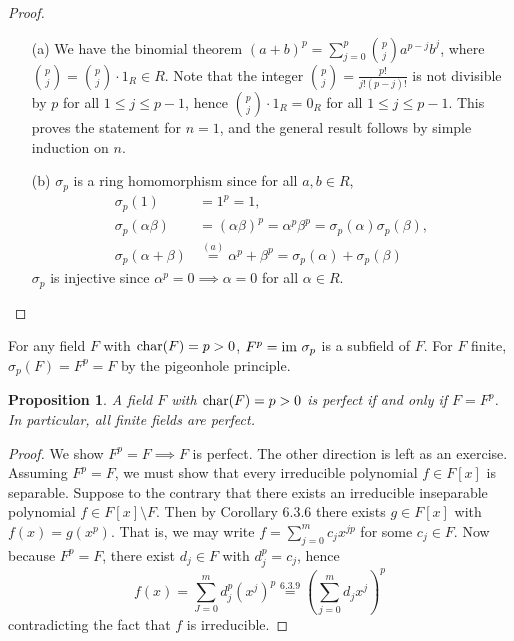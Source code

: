 \documentclass[11pt]{book}
\newcounter{counter}
\newtheorem{proposition}[counter]{Proposition}   \newtheorem{problem}[counter]{Problem}   \newtheorem*{proposition*}{Proposition}   \newtheorem*{lemma*}{Lemma}
\theoremstyle{definition}   \newtheorem{defn}[counter]{Definition} %
\newcommand{\bs}{\setminus}   \newcommand{\A}{\mathcal{A}}   \newcommand{\sy}{\textnormal{Syl}}   \newcommand{\size}[1]{\left| #1 \right|}
\newcommand{\vs}{\vspace{8pt}}   \newcommand{\hs}{\hspace{8pt}}
\numberwithin{counter}{chapter}
\begin{document}
\begin{proof}\ 
\begin{enumerate}
\item[(a)] We have the binomial theorem $(a+b)^p = \sum_{j=0}^p {p \choose j} a^{p-j} b^j$, where ${p \choose j} = {p \choose j} \cdot 1_R \in R$. Note that the integer ${p \choose j} = \frac{p!}{j!(p-j)!}$ is not divisible by $p$ for all $1 \leq j \leq p-1$, hence ${p \choose j} \cdot 1_R = 0_R$ for all $1 \leq j \leq p-1$. This proves the statement for $n = 1$, and the general result follows by simple induction on $n$. 

\item[(b)] $\sigma_p$ is a ring homomorphism since for all $a,b \in R$, 
\begin{align*}
\sigma_p(1) &= 1^p = 1, \\
\sigma_p(\alpha \beta) &= (\alpha \beta)^p = \alpha^p \beta^p = \sigma_p(\alpha) \sigma_p(\beta), \\
\sigma_p(\alpha + \beta) &\overset{(a)}{=} \alpha^p + \beta^p = \sigma_p(\alpha) + \sigma_p(\beta)
\end{align*}
$\sigma_p$ is injective since $\alpha^p = 0 \implies \alpha = 0$ for all $\alpha \in R$. 
\end{enumerate}
\end{proof}

\vs

\begin{remark}
For any field $F$ with $\textnormal{char}(F) = p > 0$, $F^p = \textnormal{im } \sigma_p$ is a subfield of $F$. For $F$ finite, $\sigma_p(F) = F^p = F$ by the pigeonhole principle. 
\end{remark}

\vs

\begin{proposition}
A field $F$ with $\textnormal{char}(F) = p > 0$ is perfect if and only if $F = F^p$. In particular, all finite fields are perfect. 
\end{proposition}

\begin{proof}
We show $F^p = F \implies F$ is perfect. The other direction is left as an exercise. Assuming $F^p = F$, we must show that every irreducible polynomial $f \in F[x]$ is separable. Suppose to the contrary that there exists an irreducible inseparable polynomial $f \in F[x] \bs F$. Then by Corollary 6.3.6 there exists $g \in F[x]$ with $f(x) = g(x^p)$. That is, we may write $f = \sum_{j=0}^m c_j x^{jp}$ for some $c_j \in F$. Now because $F^p = F$, there exist $d_j \in F$ with $d_j^p = c_j$, hence 
	\[f(x) = \sum_{J=0}^m d_j^p (x^j)^p \overset{6.3.9}{=} \left(\sum_{j=0}^m d_j x^j\right)^p \]
contradicting the fact that $f$ is irreducible. 
\end{proof}
\end{document}
